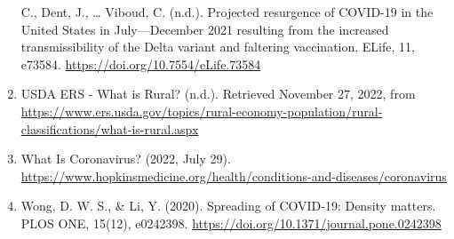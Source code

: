 \documentclass[
  12pt,
]{article}
\begin{document}
\begin{enumerate}
  C., Dent, J., \ldots{} Viboud, C. (n.d.). Projected resurgence of
  COVID-19 in the United States in July---December 2021 resulting from
  the increased transmissibility of the Delta variant and faltering
  vaccination. ELife, 11, e73584.
  \url{https://doi.org/10.7554/eLife.73584}
\item
  USDA ERS - What is Rural? (n.d.). Retrieved November 27, 2022, from
  \url{https://www.ers.usda.gov/topics/rural-economy-population/rural-classifications/what-is-rural.aspx}
\item
  What Is Coronavirus? (2022, July 29).
  \url{https://www.hopkinsmedicine.org/health/conditions-and-diseases/coronavirus}
\item
  Wong, D. W. S., \& Li, Y. (2020). Spreading of COVID-19: Density
  matters. PLOS ONE, 15(12), e0242398.
  \url{https://doi.org/10.1371/journal.pone.0242398}
\end{enumerate}
\end{document}
